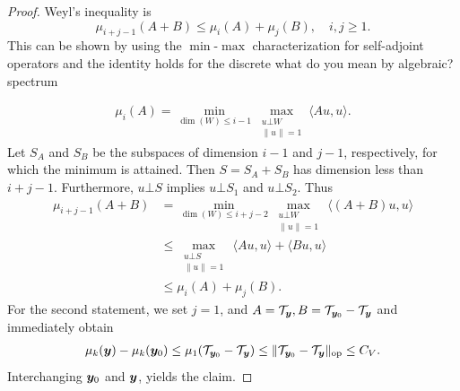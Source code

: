 \begin{proof}
    Weyl's inequality is 
    \begin{equation*}
        \mu_{i+j-1}(A+ B)  \leq \mu_{i}(A) + \mu_j(B), \quad i,j \geq 1.
    \end{equation*}
    This can be shown by using the $\min$-$\max$ characterization for self-adjoint operators and the identity holds for the discrete \ac{what do you mean by algebraic?} spectrum
    
    \begin{align*}
        \mu_{i} (A) = \min_{ \dim(W) \leq i-1} \max_{\substack{u \bot W \\\| u \| = 1}}  \langle Au,u \rangle.
    \end{align*}
    Let $S_A$ and $S_B$ be the subspaces of dimension $i-1$ and $j-1$, respectively, for which the minimum is attained.
    Then $S = S_A + S_B$ has dimension less than $i+j-1$. Furthermore, $u \bot S$ implies $u \bot S_1$ and $u \bot S_2$.
    Thus
 \begin{align*}
     \mu_{i+j-1} (A + B) &= \min_{ \dim(W) \leq i+j-2} \max_{\substack{u \bot W \\\| u \| = 1}} \, \langle (A+B)u,u \rangle \\
     &\leq \max_{ \substack{u \bot S \\\| u \| = 1}} \, \langle Au,u \rangle + \langle Bu,u \rangle \\
     &\leq \mu_{i}(A) + \mu_j(B).
 \end{align*}
 For the second statement, we set $j = 1$, and $A = \mathcal{T}_{{\boldsymbol{y}}}, B = \mathcal{T}_{{\boldsymbol{y}}_0}-  \mathcal{T}_{{\boldsymbol{y}}}$ and immediately obtain 
\begin{align*}
     \mu_{k} ({\boldsymbol{y}})- \mu_k({\boldsymbol{y}}_0)  \leq \mu_1(\mathcal{T}_{{\boldsymbol{y}}_0}-\mathcal{T}_{{\boldsymbol{y}}})  \leq \| \mathcal{T}_{{\boldsymbol{y}}_0}-\mathcal{T}_{{\boldsymbol{y}}} \|_{\mathrm{op}}  \leq C_V.
\end{align*} Interchanging ${\boldsymbol{y}}_0$ and ${\boldsymbol{y}}$, yields the claim.
\end{proof}


